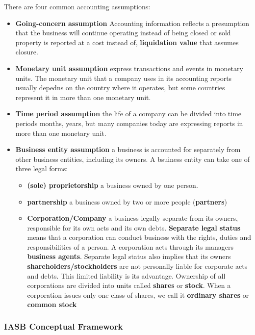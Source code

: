 \documentclass[../main.tex]{subfiles}
\begin{document}
	There are four common accounting assumptions:
	\begin{itemize}[noitemsep]
		\item \textbf{Going-concern assumption} \ie Accounting information 
		reflects a presumption that the business will continue operating 
		instead of being closed or sold \ie property is reported at a cost 
		instead of, \textbf{liquidation value} that assumes closure. 
		\item \textbf{Monetary unit assumption} \ie express transactions and 
		events in monetary units. The monetary unit that a company uses in its 
		accounting reports usually depedns on the country where it operates, 
		but some countries represent it in more than one monetary unit.   
		\item \textbf{Time period assumption} \ie the life of a company can be 
		divided into time periods \eg months, years, but many companies today 
		are expressing reports in more than one monetary unit.
		\item \textbf{Business entity assumption} \ie a business is accounted 
		for separately from other business entities, including its owners. A 
		bsuiness entity can take one of three legal forms:
		\begin{itemize}[noitemsep]
			\item \textbf{(sole) proprietorship} \ie a business owned by one 
			person. 
			\item \textbf{partnership} \ie a business owned by two or more 
			people (\textbf{partners})
			\item \textbf{Corporation/Company} \ie a business legally separate 
			from its owners, responsible for its own acts and its own debts. 
			\textbf{Separate legal status} means that a corporation can conduct 
			business with the rights, duties and responsibilities of a person. 
			A corporation acts through its managers \ie \textbf{business 
			agents}. Separate legal status also implies that its owners \ie 
			\textbf{shareholders/stockholders} are not personally liable for 
			corporate acts and debts. This limited liability is its advantage. 
			Ownership of all corporations are divided into units called 
			\textbf{shares} or \textbf{stock}. When a corporation issues only 
			one class of shares, we call it \textbf{ordinary shares} or 
			\textbf{common stock}
		\end{itemize}
	\end{itemize}
	
	\subsubsection{IASB Conceptual Framework}
	
\end{document}
